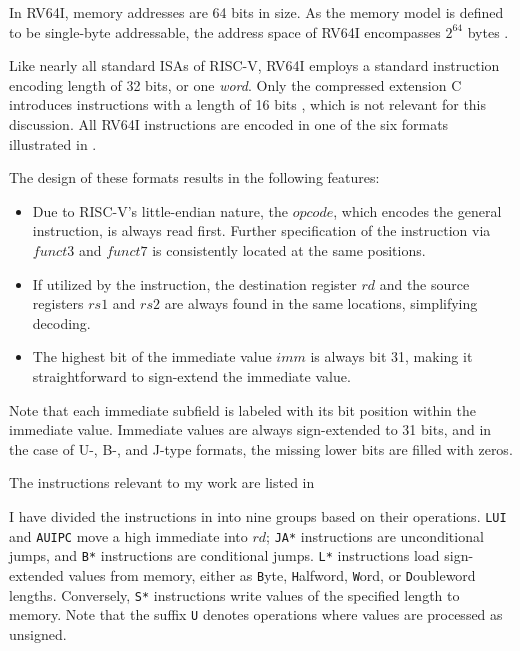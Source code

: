 In RV64I, memory addresses are 64 bits in size. As the memory model is defined
to be single-byte addressable, the address space of RV64I encompasses $2^{64}$
bytes \cite[Chapter 1.4]{riscv-isa}.

Like nearly all standard ISAs of RISC-V, RV64I employs a standard instruction
encoding length of 32 bits, or one \emph{word}. Only the compressed extension C
introduces instructions with a length of 16 bits \cite[Chapter 1.5]{riscv-isa},
which is not relevant for this discussion. All RV64I instructions are encoded
in one of the six formats illustrated in .



The design of these formats results in the following features:
\begin{itemize}
      \item Due to RISC-V's little-endian nature, the $opcode$, which encodes the general
            instruction, is always read first. Further specification of the instruction via
            $funct3$ and $funct7$ is consistently located at the same positions.
      \item If utilized by the instruction, the destination register $rd$ and the source
            registers $rs1$ and $rs2$ are always found in the same locations, simplifying
            decoding.
      \item The highest bit of the immediate value $imm$ is always bit 31, making it
            straightforward to sign-extend the immediate value.
\end{itemize}
Note that each immediate subfield is labeled with its bit position within the immediate value.
Immediate values are always sign-extended to 31 bits, and in the case of U-, B-, and J-type formats, the missing lower bits are filled with zeros.

The instructions relevant to my work are listed in

I have divided the instructions in  into nine
groups based on their operations. \texttt{LUI} and \texttt{AUIPC} move a high
immediate into $rd$; \texttt{JA*} instructions are unconditional jumps, and
\texttt{B*} instructions are conditional jumps. \texttt{L*} instructions load
sign-extended values from memory, either as \texttt{B}yte, \texttt{H}alfword,
\texttt{W}ord, or \texttt{D}oubleword lengths. Conversely, \texttt{S*}
instructions write values of the specified length to memory. 
Note that the suffix \texttt{U} denotes operations where values are processed
as unsigned.

